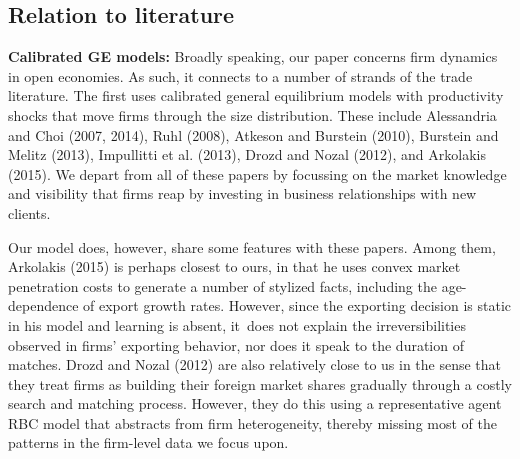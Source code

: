 \documentclass[12pt]{article}
\begin{document}
\subsection{Relation to literature}

\textbf{Calibrated GE models:} Broadly speaking, our paper concerns firm
dynamics in open economies. As such, it connects to a number of strands of
the trade literature. The first uses calibrated general equilibrium models
with productivity shocks that move firms through the size distribution.
These include Alessandria and Choi (2007, 2014), Ruhl (2008), 
Atkeson and Burstein (2010), Burstein and Melitz (2013), Impullitti et al.
(2013), Drozd and Nozal (2012), and Arkolakis (2015). We depart from all of
these papers by focussing on the market knowledge and visibility that firms
reap by investing in business relationships with new clients.

Our model does, however, share some features with these papers. Among them,
Arkolakis (2015) is perhaps closest to ours, in that he uses convex market
penetration costs to generate a number of stylized facts, including the
age-dependence of export growth rates. However, since the exporting decision
is static in his model and learning is absent, it\ does not explain the
irreversibilities observed in firms' exporting behavior, nor does it speak
to the duration of matches. Drozd and Nozal (2012) are also relatively close
to us in the sense that they treat firms as building their foreign market
shares gradually through a costly search and matching process. However, they
do this using a representative agent RBC model that abstracts from firm
heterogeneity, thereby missing most of the patterns in the firm-level data
we focus upon.
\end{document}
